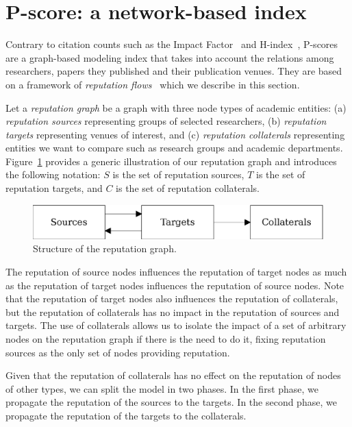 \documentclass[notitlepage]{svjour3}
\begin{document}
\section{P-score: a network-based index} 
\label{pscore} 

Contrary to citation counts such as the Impact 
Factor~\cite{Garfield1955a,Saha2003,Thomson2017,Balaban2012} and 
H-index~\cite{Benevenuto2016,Bar-Ilan2008,Egghe2008,Bornmann2005,Bornmann2011}, 
P-scores are a graph-based modeling index that takes into account 
the relations among researchers, papers they published and their publication venues. They are based on a framework of \textit{reputation flows}~\cite{Ribas2015} which we describe in this section.

Let a \emph{reputation graph} be a graph with three node types of academic entities: (a) {\em reputation sources} representing groups of selected researchers, 
(b) {\em reputation targets} representing venues of interest, and
(c) {\em reputation collaterals} representing entities we want to compare such as research groups and academic 
departments. 
Figure~\ref{fig:overview} provides a generic illustration of our reputation graph and introduces the following 
notation: $S$ is the set of reputation sources, $T$ is the set of reputation targets, and $C$ is the set of reputation collaterals.

\begin{figure}[ht]
   \centerline{\includegraphics[scale=0.6]{figures/overview-line}}
   \caption{Structure of the reputation graph.}
   \label{fig:overview}
\end{figure}

The reputation of source nodes influences the reputation
of target nodes as much as the reputation of target nodes
influences the reputation of source nodes. Note that the
reputation of target nodes also influences the reputation of
collaterals, but the reputation of collaterals has no impact
in the reputation of sources and targets. The use of collaterals
allows us to isolate the impact of a set of arbitrary
nodes on the reputation graph if there is the need to do it, 
fixing reputation sources as the only set of nodes providing reputation. 

Given that the reputation of collaterals has no effect on
the reputation of nodes of other types, we can split the model
in two phases. In the first phase, we propagate the reputation
of the sources to the targets. In the second phase, we
propagate the reputation of the targets to the collaterals.
\end{document}
